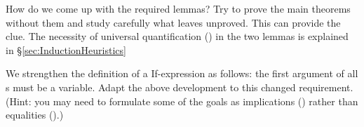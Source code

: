 \begin{isabellebody}
\isadelimproof
%
\endisadelimproof
%
\isatagproof
%
\endisatagproof
{\isafoldproof}%
%
\isadelimproof
%
\endisadelimproof
%
\isadelimproof
%
\endisadelimproof
%
\isatagproof
%
\endisatagproof
{\isafoldproof}%
%
\isadelimproof
%
\endisadelimproof
%
\begin{isamarkuptext}%
\medskip
How do we come up with the required lemmas? Try to prove the main theorems
without them and study carefully what  leaves unproved. This 
can provide the clue.  The necessity of universal quantification
() in the two lemmas is explained in
\S\ref{sec:InductionHeuristics}

\begin{exercise}
  We strengthen the definition of a  If-expression as follows:
  the first argument of all s must be a variable. Adapt the above
  development to this changed requirement. (Hint: you may need to formulate
  some of the goals as implications () rather than
  equalities ().)
\end{exercise}
%
\end{isamarkuptext}%
\isamarkuptrue%
%
\isadelimproof
%
\endisadelimproof
%
\isatagproof
%
\endisatagproof
{\isafoldproof}%
%
\isadelimproof
%
\endisadelimproof
%
\isadelimproof
%
\endisadelimproof
%
\isatagproof
%
\endisatagproof
{\isafoldproof}%
%
\isadelimproof
%
\endisadelimproof
%
\isadelimproof
%
\endisadelimproof
%
\isatagproof
%
\endisatagproof
{\isafoldproof}%
%
\isadelimproof
%
\endisadelimproof
%
\isadelimproof
%
\endisadelimproof
%
\isatagproof
%
\endisatagproof
{\isafoldproof}%
%
\isadelimproof
%
\endisadelimproof
%
\isadelimtheory
%
\endisadelimtheory
%
\isatagtheory
%
\endisatagtheory
{\isafoldtheory}%
%
\isadelimtheory
%
\endisadelimtheory
\end{isabellebody}%

